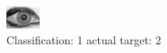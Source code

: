 \begin{figure}[h!]
\begin{center}
\includegraphics[width=0.60\columnwidth]{figures/ID2045_class_1_target_2.png}
\end{center}
\caption{ Classification: 1 actual target: 2}
\label{fig:ID2045_class_1_target_2}
\end{figure}
